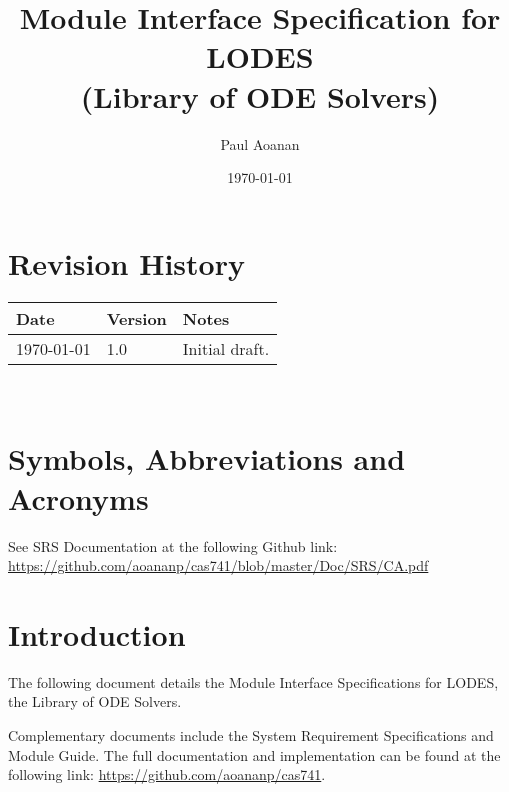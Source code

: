 \documentclass[12pt, titlepage]{article}
\newcommand{\progname}{LODES}
\newcommand{\progdesc}{Library of ODE Solvers}
\begin{document}
\title{Module Interface Specification for \progname{}\\ (\progdesc{})}

\author{Paul Aoanan}

\date{\today}

\maketitle


\section{Revision History}

\begin{tabularx}{\textwidth}{p{3cm}p{2cm}X}
\toprule {\bf Date} & {\bf Version} & {\bf Notes}\\
\midrule
\today{} & 1.0 & Initial draft.\\
\bottomrule
\end{tabularx}

~\newpage

\section{Symbols, Abbreviations and Acronyms}

See SRS Documentation at the following Github link:\\
\url{https://github.com/aoananp/cas741/blob/master/Doc/SRS/CA.pdf}


\newpage

\tableofcontents

\listoftables

\newpage


\section{Introduction}

The following document details the Module Interface Specifications for
\progname{}, the \progdesc{}.

Complementary documents include the System Requirement Specifications
and Module Guide.  The full documentation and implementation can be
found at the following link: \url{https://github.com/aoananp/cas741}. 
\end{document}
